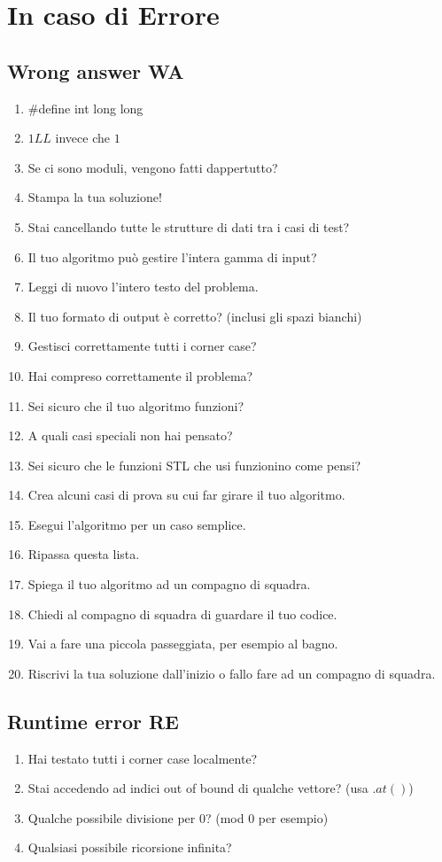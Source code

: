 \section{In caso di Errore}

\subsection{Wrong answer WA}
\begin{enumerate}
    \item $\#$define int long long
    \item $1LL$ invece che $1$
    \item Se ci sono moduli, vengono fatti dappertutto?
    \item Stampa la tua soluzione!
    \item Stai cancellando tutte le strutture di dati tra i casi di test?
    \item Il tuo algoritmo può gestire l'intera gamma di input?
    \item Leggi di nuovo l'intero testo del problema.
    \item Il tuo formato di output è corretto? (inclusi gli spazi bianchi)
    \item Gestisci correttamente tutti i corner case?
    \item Hai compreso correttamente il problema?
    \item Sei sicuro che il tuo algoritmo funzioni?
    \item A quali casi speciali non hai pensato?
    \item Sei sicuro che le funzioni STL che usi funzionino come pensi?
    \item Crea alcuni casi di prova su cui far girare il tuo algoritmo.
    \item Esegui l'algoritmo per un caso semplice.
    \item Ripassa questa lista.
    \item Spiega il tuo algoritmo ad un compagno di squadra.
    \item Chiedi al compagno di squadra di guardare il tuo codice.
    \item Vai a fare una piccola passeggiata, per esempio al bagno.
    \item Riscrivi la tua soluzione dall'inizio o fallo fare ad un compagno di squadra.
\end{enumerate}

\subsection{Runtime error RE}
\begin{enumerate}
    \item Hai testato tutti i corner case localmente?
    \item Stai accedendo ad indici out of bound di qualche vettore? (usa $.at()$)
    \item Qualche possibile divisione per 0? (mod 0 per esempio)
    \item Qualsiasi possibile ricorsione infinita?
\end{enumerate}

